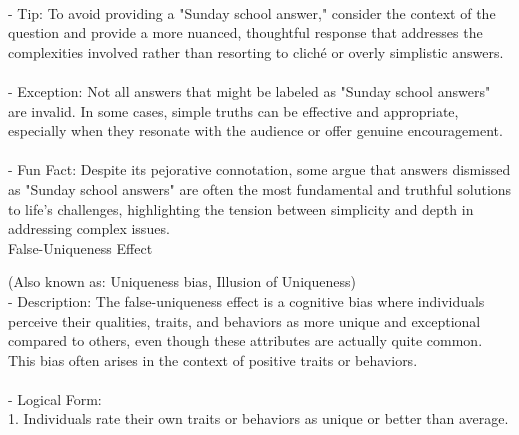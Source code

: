 \documentclass[a4paper,12pt,single,pdftex]{scrartcl}
\begin{document}
    
      
    \\

    
      - Tip: To avoid providing a "Sunday school answer," consider the context of the question and provide a more nuanced, thoughtful response that addresses the complexities involved rather than resorting to cliché or overly simplistic answers.
    \\

    
      
    \\

    
      - Exception: Not all answers that might be labeled as "Sunday school answers" are invalid. In some cases, simple truths can be effective and appropriate, especially when they resonate with the audience or offer genuine encouragement.
    \\

    
      
    \\

    
      - Fun Fact: Despite its pejorative connotation, some argue that answers dismissed as "Sunday school answers" are often the most fundamental and truthful solutions to life’s challenges, highlighting the tension between simplicity and depth in addressing complex issues.
    \\

  

False-Uniqueness Effect
    
      (Also known as: Uniqueness bias, Illusion of Uniqueness)
    \\

  
    
      - Description: The false-uniqueness effect is a cognitive bias where individuals perceive their qualities, traits, and behaviors as more unique and exceptional compared to others, even though these attributes are actually quite common. This bias often arises in the context of positive traits or behaviors.
    \\

    
      
    \\

    
      - Logical Form:
    \\

    
        1. Individuals rate their own traits or behaviors as unique or better than average.
    \\
\end{document}
